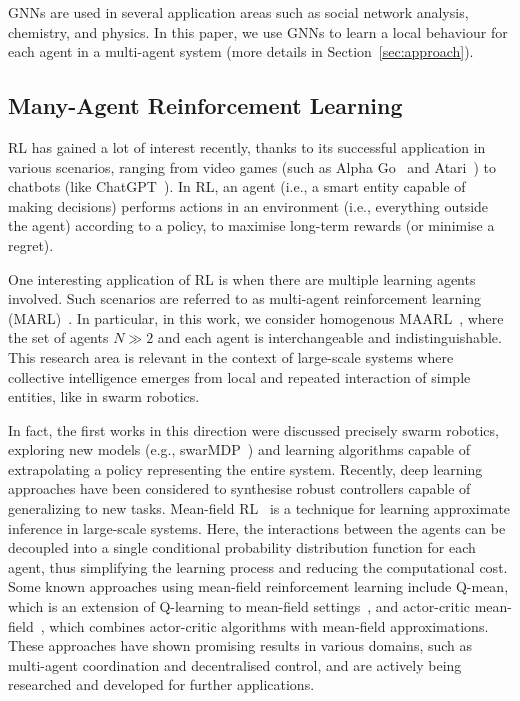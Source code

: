 \documentclass[conference]{IEEEtran}
\begin{document}
\acp{GNN} are used in several application areas such as social network analysis, chemistry, and physics.
In this paper, we use GNNs to learn a local behaviour for each agent in a multi-agent system (more details in Section~\ref{sec:approach}).
\subsection{Many-Agent Reinforcement Learning}

 \Ac{RL} has gained a lot of interest recently, 
 thanks to its successful application in various scenarios, 
 ranging from video games (such as Alpha Go~\cite{Silver2016Go} and Atari~\cite{Atari2016DQN}) 
 to chatbots (like ChatGPT~\cite{ChatGPT2023}). 
% 
In \ac{RL}, an agent (i.e., a smart entity capable of making decisions) 
 performs actions in an environment (i.e., everything outside the agent) according to a policy, 
 to maximise long-term rewards (or minimise a regret).

One interesting application of \ac{RL} is when there are multiple learning agents involved. 
 Such scenarios are referred to as multi-agent reinforcement learning (MARL)~\cite{zhang2019marl}. 
%
In particular, in this work, we consider homogenous \ac{MAARL}~\cite{yang2021many}, 
 where the set of agents $N \gg 2$ and each agent is interchangeable and indistinguishable.
%
This research area is relevant in the context of large-scale systems 
 where collective intelligence emerges from local and repeated interaction of simple entities, like in swarm robotics.

In fact, the first works in this direction were discussed precisely swarm robotics, %
 exploring new models (e.g., swarMDP~\cite{DBLP:conf/atal/SosicKZK17}) and learning algorithms capable of extrapolating a policy representing the entire system.  
 Recently, deep learning approaches have been considered 
 to synthesise robust controllers capable of generalizing to new tasks. 
 Mean-field RL~\cite{pmlr-v80-yang18d}  is a technique for learning approximate inference in large-scale systems. Here, the interactions between the agents can be decoupled into a single conditional probability distribution function for each agent, 
 thus simplifying the learning process and reducing the computational cost.
%
Some known approaches using mean-field reinforcement learning include Q-mean, 
 which is an extension of Q-learning to mean-field settings~\cite{yang2018mean}, 
 and actor-critic mean-field~\cite{frikha2023actor}, which combines actor-critic algorithms with mean-field approximations. 
%
These approaches have shown promising results in various domains, such as multi-agent coordination 
 and decentralised control, and are actively being researched and developed for further applications.
\end{document}
